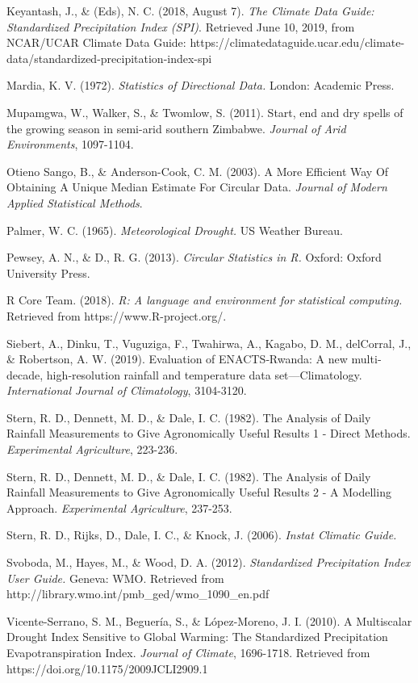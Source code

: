 \documentclass[
  letterpaper,
  DIV=11,
  numbers=noendperiod]{scrreprt}
\begin{document}
Keyantash, J., \& (Eds), N. C. (2018, August 7). \emph{The Climate Data
Guide: Standardized Precipitation Index (SPI)}. Retrieved June 10, 2019,
from NCAR/UCAR Climate Data Guide:
https://climatedataguide.ucar.edu/climate-data/standardized-precipitation-index-spi

Mardia, K. V. (1972). \emph{Statistics of Directional Data.} London:
Academic Press.

Mupamgwa, W., Walker, S., \& Twomlow, S. (2011). Start, end and dry
spells of the growing season in semi-arid southern Zimbabwe.
\emph{Journal of Arid Environments}, 1097-1104.

Otieno Sango, B., \& Anderson-Cook, C. M. (2003). A More Efficient Way
Of Obtaining A Unique Median Estimate For Circular Data. \emph{Journal
of Modern Applied Statistical Methods}.

Palmer, W. C. (1965). \emph{Meteorological Drought.} US Weather Bureau.

Pewsey, A. N., \& D., R. G. (2013). \emph{Circular Statistics in R.}
Oxford: Oxford University Press.

R Core Team. (2018). \emph{R: A language and environment for statistical
computing.} Retrieved from https://www.R-project.org/.

Siebert, A., Dinku, T., Vuguziga, F., Twahirwa, A., Kagabo, D. M.,
delCorral, J., \& Robertson, A. W. (2019). Evaluation of ENACTS‐Rwanda:
A new multi‐decade, high‐resolution rainfall and temperature data
set---Climatology. \emph{International Journal of Climatology},
3104-3120.

Stern, R. D., Dennett, M. D., \& Dale, I. C. (1982). The Analysis of
Daily Rainfall Measurements to Give Agronomically Useful Results 1 -
Direct Methods. \emph{Experimental Agriculture}, 223-236.

Stern, R. D., Dennett, M. D., \& Dale, I. C. (1982). The Analysis of
Daily Rainfall Measurements to Give Agronomically Useful Results 2 - A
Modelling Approach. \emph{Experimental Agriculture}, 237-253.

Stern, R. D., Rijks, D., Dale, I. C., \& Knock, J. (2006). \emph{Instat
Climatic Guide.}

Svoboda, M., Hayes, M., \& Wood, D. A. (2012). \emph{Standardized
Precipitation Index User Guide.} Geneva: WMO. Retrieved from
http://library.wmo.int/pmb\_ged/wmo\_1090\_en.pdf

Vicente-Serrano, S. M., Beguería, S., \& López-Moreno, J. I. (2010). A
Multiscalar Drought Index Sensitive to Global Warming: The Standardized
Precipitation Evapotranspiration Index. \emph{Journal of Climate},
1696-1718. Retrieved from https://doi.org/10.1175/2009JCLI2909.1
\end{document}
